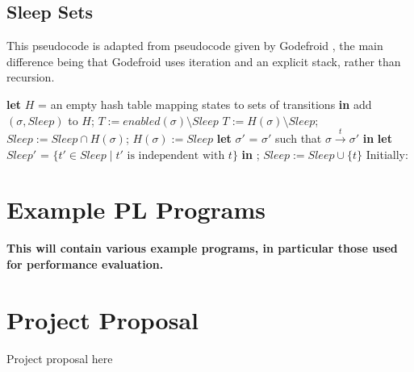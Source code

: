 \documentclass[12pt,a4paper,twoside,openright]{report}
\newcommand{\Let}[2]{\State \textbf{let} #1 = #2 \textbf{in}}
\begin{document}
\section{Sleep Sets}
\label{sapp:sleep-code}

This pseudocode is adapted from pseudocode
given by Godefroid \cite{god96}, the main
difference being that Godefroid uses
iteration and an explicit stack, rather
than recursion.
\smallskip
\begin{algorithmic}[1]
	\Let{$H$}{an empty hash table mapping
		states to sets of transitions}
	\State
	\State add $(\sigma, \textit{Sleep})$ to $H$;
	\State$T := \textit{enabled}(\sigma)
	\setminus \textit{Sleep}$
	\Else
	\State$T := H(\sigma) \setminus
	\textit{Sleep}$;
	\State $\textit{Sleep} := \textit{Sleep}
	\cap H(\sigma)$;
	\State $H(\sigma) := \textit{Sleep}$
	\EndIf
	\Let{$\sigma'$}{$\sigma'$ such that
		$\sigma \xrightarrow{t} \sigma'$}
	\Let{$\textit{Sleep}'$}{$\{t' \in \textit{Sleep}
		\mid t' \text{ is independent with } t\}$}
	\State{};
	\State $\textit{Sleep} := \textit{Sleep} \cup \{t\}$
	\EndFor
	\EndProcedure
	\State
	\State Initially: 
\end{algorithmic}

\chapter{Example PL Programs}

\textbf{This will contain various
	example programs, in particular
	those used for performance evaluation.}

\chapter{Project Proposal}

Project proposal here
% 
\end{document}
